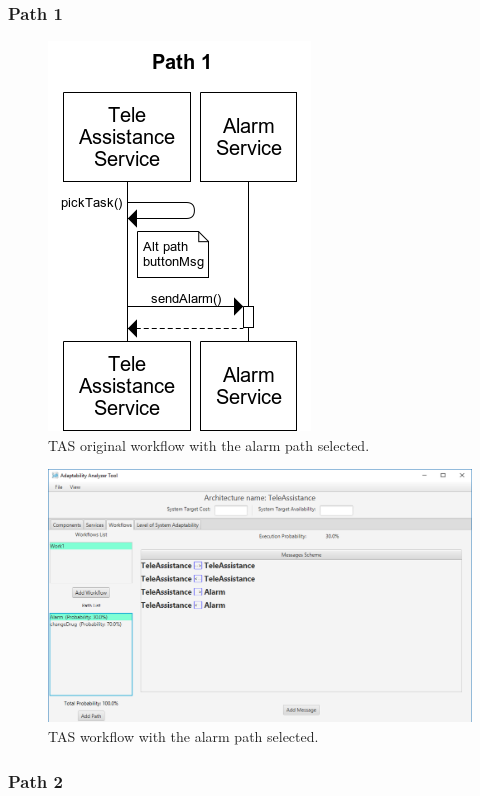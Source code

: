 \subsubsection{Path 1}
\begin{figure}[ht]
	\centerline
	{\includegraphics[scale=0.55]{img/TeleAssistanceOrigPath1.png}}
	\caption[TAS Original Workflow Path Alarm]{TAS original workflow with the alarm path selected.}
	\label{fig:tas-or-path1}
\end{figure}

\begin{figure}[ht]
	\centerline
	{\includegraphics[scale=0.55]{img/TeleAssistancePath1.png}}
	\caption[TAS Workflow Path Alarm]{TAS workflow with the alarm path selected.}
	\label{fig:tas-path1}
\end{figure}

\clearpage
\subsubsection{Path 2}

